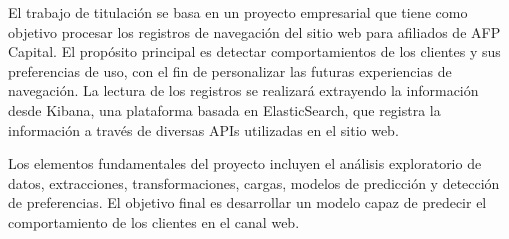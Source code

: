 El trabajo de titulación se basa en un proyecto empresarial que tiene como objetivo procesar los registros de navegación del sitio web para afiliados de AFP Capital. El propósito principal es detectar comportamientos de los clientes y sus preferencias de uso, con el fin de personalizar las futuras experiencias de navegación. La lectura de los registros se realizará extrayendo la información desde Kibana, una plataforma basada en ElasticSearch, que registra la información a través de diversas APIs utilizadas en el sitio web.

Los elementos fundamentales del proyecto incluyen el análisis exploratorio de datos, extracciones, transformaciones, cargas, modelos de predicción y detección de preferencias. El objetivo final es desarrollar un modelo capaz de predecir el comportamiento de los clientes en el canal web.
